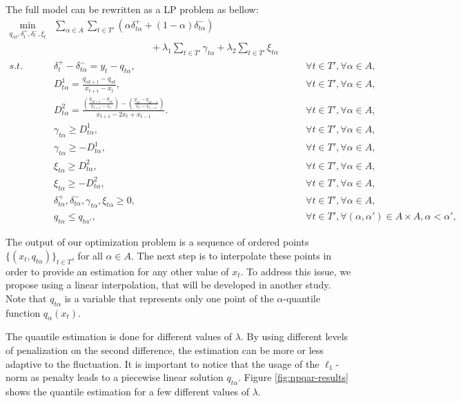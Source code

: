 The full model can be rewritten as a LP problem as bellow:
\begin{eqnarray}
\min_{q_{\alpha t},\delta^+_{t}, \delta_t^-, \xi_t} & \sum_{\alpha \in A} \sum_{t \in T'}\left(\alpha\delta_{t \alpha }^{+}+(1-\alpha)\delta_{t \alpha }^{-}\right) & \\
& \qquad \qquad \qquad \qquad \qquad + \lambda_1\sum_{t \in T'}\gamma_{t \alpha } + \lambda_2\sum_{t \in T'}\xi_{t \alpha } & \nonumber \\
s.t. & \delta_{t}^{+}-\delta_{t \alpha }^{-}=y_{t}-q_{t \alpha }, & \qquad\forall t \in T',\forall \alpha \in A,\\
   & D^{1}_{t \alpha }=\frac{q_{\alpha t+1}-q_{\alpha t}}{x_{t+1}-x_{t}},
    & \qquad\forall t \in T',\forall \alpha \in A,\\   
 & D^{2}_{t \alpha }=\frac{\left(\frac{q_{\alpha t+1}-q_{\alpha t}}{x_{t+1}-x_{t}}\right)-\left(\frac{q_{\alpha t}-q_{\alpha t-1}}{x_{t}-x_{t-1}}\right)}{x_{t+1}-2x_{t} + x_{t-1}}.
  & \qquad\forall t \in T',\forall \alpha \in A,\\
 & \gamma_{t \alpha}\geq D^1_{t \alpha }, & \qquad\forall t \in T',\forall \alpha \in A,\\
  & \gamma_{t \alpha}\geq-D^1_{t \alpha}, & \qquad\forall t \in T',\forall \alpha \in A,\\
  & \xi_{t \alpha}\geq D^2_{t \alpha }, & \qquad\forall t \in T',\forall \alpha \in A,\\
 & \xi_{t \alpha}\geq-D^2_{t \alpha}, & \qquad\forall t \in T',\forall \alpha \in A,\\
 & \delta_{t \alpha}^{+},\delta_{t \alpha}^{-},\gamma_{t \alpha}, \xi_{t \alpha}\geq0, & \qquad\forall t \in T',\forall \alpha \in A,\\
  & q_{t \alpha} \leq q_{t \alpha'}, & \qquad \forall t \in T', \forall (\alpha, \alpha') \in A \times A, \alpha < \alpha', 
  \end{eqnarray}


The output of our optimization problem is a sequence of ordered points $\{(x_t, q_{t \alpha})\}_{t \in T}$, for all $\alpha \in A$. The next step is to interpolate these points in order to provide an estimation for any other value of $x_t$. To address this issue, we propose using a linear interpolation, that will be developed in another study. Note that $q_{t \alpha}$ is a variable that represents only one point of the $\alpha$-quantile function $q_\alpha(x_t)$. 

The quantile estimation is done for different values of $\lambda$. By using different levels of penalization on the second difference, the estimation can be more or less adaptive to the fluctuation. It is important to notice that the usage of the $\ell_1$-norm as penalty leads to a piecewise linear solution $q_{t \alpha}$. %
Figure \ref{fig:npqar-results} shows the quantile estimation for a few different values of $\lambda$. 

